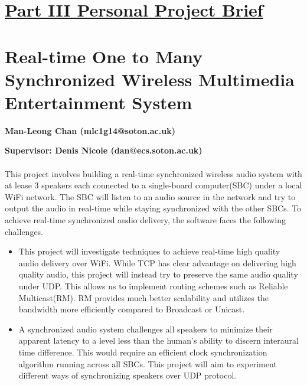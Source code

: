 \documentclass[12pt]{article}
\date{}
\begin{document}
\begin{minipage}[t][0pt]{\linewidth}

\section*{\underline{Part III Personal Project Brief}}

\section*{Real-time One to Many Synchronized Wireless Multimedia Entertainment System}

 

\textbf{Man-Leong Chan (mlc1g14@soton.ac.uk)}

\textbf{Supervisor: Denis Nicole (dan@ecs.soton.ac.uk)}

\paragraph{}
This project involves building a real-time synchronized wireless audio system with at lease 3 speakers each connected to a single-board computer(SBC) under a local WiFi network. The SBC will listen to an audio source in the network and try to output the audio in real-time while staying synchronized with the other SBCs. To achieve real-time synchronized audio delivery, the software faces the following challenges. 

\begin{itemize}
\item
This project will investigate techniques to achieve real-time high quality audio delivery over WiFi. While TCP has clear advantage on delivering high quality audio, this project will instead try to preserve the same audio quality under UDP. This allows us to implement routing schemes such as Reliable Multicast(RM). RM provides much better scalability and utilizes the bandwidth more efficiently compared to Broadcast or Unicast. 

\item
A synchronized audio system challenges all speakers to minimize their apparent latency to a level less than the human’s ability to discern interaural time difference. This would require an efficient clock synchronization algorithm running across all SBCs. This project will aim to experiment different ways of synchronizing speakers over UDP protocol.  

\end{itemize}

\end{minipage}
\end{document}
